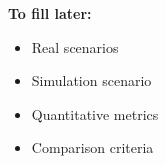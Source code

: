 \vspace{0.2cm}
\begin{outlinecard}
\small
\textbf{To fill later:}
\begin{itemize}
  \item Real scenarios
  \item Simulation scenario
  \item Quantitative metrics
  \item Comparison criteria
\end{itemize}
\end{outlinecard}
